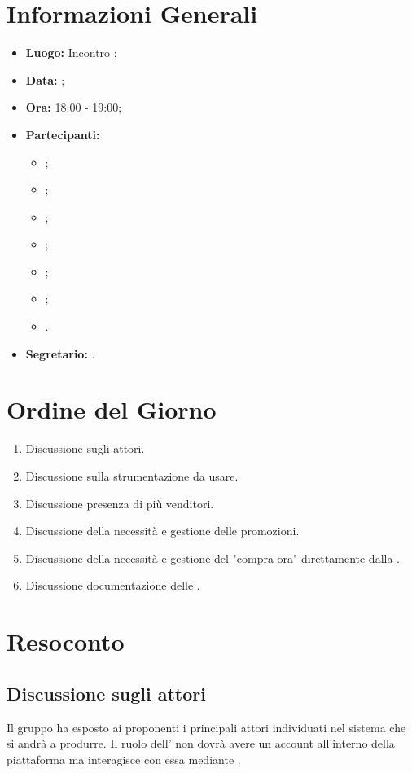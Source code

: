 \section{Informazioni Generali}
\begin{itemize}
\item \textbf{Luogo:} Incontro ;
\item \textbf{Data:} \Data;
\item \textbf{Ora:} 18:00 - 19:00;
\item \textbf{Partecipanti:}
	\begin{itemize}
		\item \BL{}; 
		\item \FF{};
		\item \MM{};
		\item \PC{};
		\item \TG{};
		\item \TL{};
		\item \VD{}.
	\end{itemize}
\item \textbf{Segretario:} \PC{}.
\end{itemize}

\section{Ordine del Giorno}
\begin{enumerate}
	\item Discussione sugli attori.
	\item Discussione sulla strumentazione da usare.
	\item Discussione presenza di più venditori.
	\item Discussione della necessità e gestione delle promozioni.
	\item Discussione della necessità e gestione del "compra ora" direttamente dalla .
	\item Discussione documentazione delle .
\end{enumerate}

\section{Resoconto}
\subsection{Discussione sugli attori}
Il gruppo ha esposto ai proponenti i principali attori individuati nel sistema che si andrà a produrre. Il ruolo dell' non dovrà avere un account all'interno della piattaforma ma interagisce con essa mediante .\\

